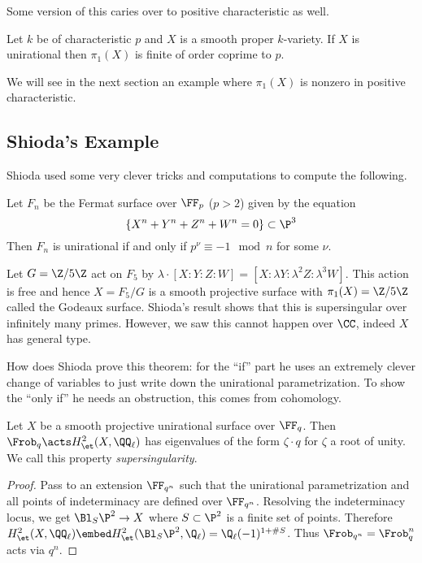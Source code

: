 \documentclass[12pt]{article}
\begin{document}
Some version of this caries over to positive characteristic as well. 

\begin{theorem}[Serre]
Let $k$ be of characteristic $p$ and $X$ is a smooth proper $k$-variety. If $X$ is unirational then $\pi_1(X)$ is finite of order coprime to $p$. 
\end{theorem}

We will see in the next section an example where $\pi_1(X)$ is nonzero in positive characteristic.


\subsection{Shioda's Example}

Shioda used some very clever tricks and computations to compute the following.

\begin{theorem}[Shioda]
Let $F_n$ be the Fermat surface over $\FF_p$ ($p > 2$) given by the equation
\[ \{ X^n + Y^n + Z^n + W^n = 0 \} \subset \P^3 \]
Then $F_n$ is unirational if and only if $p^\nu \equiv -1 \mod n$ for some $\nu$.
\end{theorem}

\begin{example}
Let $G = \Z / 5 \Z$ act on $F_5$ by $\lambda \cdot [X : Y : Z : W] = [X : \lambda Y : \lambda^2 Z : \lambda^3 W]$. This action is free and hence $X = F_5 / G$ is a smooth projective surface with $\pi_1(X) = \Z / 5 \Z$ called the Godeaux surface. Shioda's result shows that this is supersingular over infinitely many primes. However, we saw this cannot happen over $\CC$, indeed $X$ has general type. 
\end{example}

How does Shioda prove this theorem: for the ``if'' part he uses an extremely clever change of variables to just write down the unirational parametrization. To show the ``only if'' he needs an obstruction, this comes from \etale cohomology. 

\begin{prop}
Let $X$ be a smooth projective unirational surface over $\FF_q$. Then $\Frob_q \acts H^2_{\et}(X, \QQ_\ell)$ has eigenvalues of the form $\zeta \cdot q$ for $\zeta$ a root of unity. We call this property \textit{supersingularity}. 
\end{prop}

\begin{proof}
Pass to an extension $\FF_{q^n}$ such that the unirational parametrization and all points of indeterminacy are defined over $\FF_{q^n}$. Resolving the indeterminacy locus, we get $\Bl_S \P^2 \to X$ where $S \subset \P^2$ is a finite set of points. Therefore $H^2_{\et}(X, \QQ_\ell) \embed H^2_{\et}(\Bl_S \P^2, \Q_\ell) = \Q_\ell(-1)^{1 + \# S}$. Thus $\Frob_{q^n} = \Frob_{q}^n$ acts via $q^n$.  
\end{proof}
\end{document}

